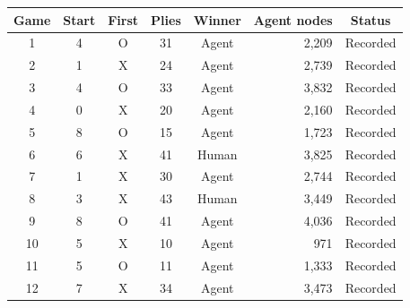 \begin{tabular}{cccccrc}
\toprule
Game & Start & First & Plies & Winner & Agent nodes & Status \\
\midrule
1 & 4 & O & 31 & Agent & 2,209 & Recorded \\
2 & 1 & X & 24 & Agent & 2,739 & Recorded \\
3 & 4 & O & 33 & Agent & 3,832 & Recorded \\
4 & 0 & X & 20 & Agent & 2,160 & Recorded \\
5 & 8 & O & 15 & Agent & 1,723 & Recorded \\
6 & 6 & X & 41 & Human & 3,825 & Recorded \\
7 & 1 & X & 30 & Agent & 2,744 & Recorded \\
8 & 3 & X & 43 & Human & 3,449 & Recorded \\
9 & 8 & O & 41 & Agent & 4,036 & Recorded \\
10 & 5 & X & 10 & Agent & 971 & Recorded \\
11 & 5 & O & 11 & Agent & 1,333 & Recorded \\
12 & 7 & X & 34 & Agent & 3,473 & Recorded \\
\bottomrule
\end{tabular}
